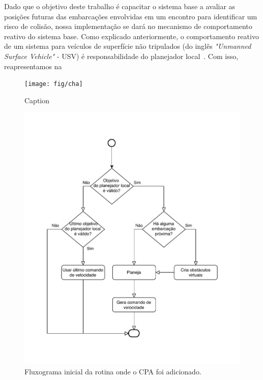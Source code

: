     
    
    Dado que o objetivo deste trabalho é capacitar o sistema base a avaliar as posições futuras das embarcações envolvidas em um encontro para identificar um risco de colisão, nossa implementação se dará no mecanismo de comportamento reativo do sistema base. Como explicado anteriormente, o comportamento reativo de um sistema para veículos de superfície não tripulados (do inglês \textit{"Unmanned Surface Vehicle"} - USV) é responsabilidade do planejador local~\cite{Jurak2020COLREGS}. Com isso, reapresentamos na 
    
    
    \begin{figure}
        \centering
        \texttt{[image: fig/cha]}
        \caption{Caption}
        \label{fig:my_label}
    \end{figure}
    
    
    
    
    \begin{figure}
        \centering
        \includegraphics{fig/chap4/find_best_path_diagram_no_cpa.pdf}
        \caption{Fluxograma inicial da rotina onde o CPA foi adicionado.}
        \label{fig:chap4_fluxograma_inicial}
    \end{figure}
    
